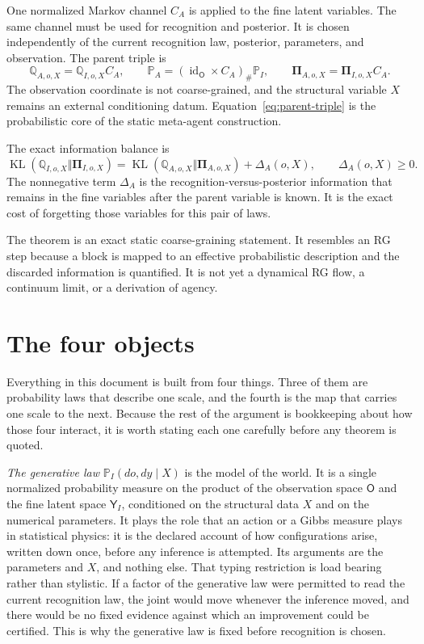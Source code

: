 \documentclass[11pt,letterpaper]{article}
\newcommand{\KL}{\operatorname{KL}}
\newcommand{\Prob}{\mathbb P}
\newcommand{\Rec}{\mathbb Q}
\newcommand{\Post}{\boldsymbol\Pi}
\newcommand{\id}{\operatorname{id}}
\begin{document}
One normalized Markov channel \(C_A\) is applied to the fine latent variables. The same channel must be used for recognition and posterior. It is chosen independently of the current recognition law, posterior, parameters, and observation. The parent triple is
\begin{equation}
  \Rec_{A,o,X}=\Rec_{I,o,X}C_A,
  \qquad
  \Prob_A=(\id_{\mathsf O}\times C_A)_{\#}\Prob_I,
  \qquad
  \Post_{A,o,X}=\Post_{I,o,X}C_A.
  \label{eq:parent-triple}
\end{equation}
The observation coordinate is not coarse-grained, and the structural variable \(X\) remains an external conditioning datum. Equation~\eqref{eq:parent-triple} is the probabilistic core of the static meta-agent construction.

The exact information balance is
\begin{equation}
  \KL(\Rec_{I,o,X}\Vert\Post_{I,o,X})
  =
  \KL(\Rec_{A,o,X}\Vert\Post_{A,o,X})
  +\Delta_A(o,X),
  \qquad
  \Delta_A(o,X)\geq 0.
  \label{eq:kl-chain-preview}
\end{equation}
The nonnegative term \(\Delta_A\) is the recognition-versus-posterior information that remains in the fine variables after the parent variable is known. It is the exact cost of forgetting those variables for this pair of laws.

\begin{physicalreading}
The theorem is an exact static coarse-graining statement. It resembles an RG step because a block is mapped to an effective probabilistic description and the discarded information is quantified. It is not yet a dynamical RG flow, a continuum limit, or a derivation of agency.
\end{physicalreading}

\section{The four objects}
\label{sec:four-objects}

Everything in this document is built from four things. Three of them are probability laws that describe one scale, and the fourth is the map that carries one scale to the next. Because the rest of the argument is bookkeeping about how those four interact, it is worth stating each one carefully before any theorem is quoted.

\textit{The generative law} \(\Prob_I(do,dy\mid X)\) is the model of the world. It is a single normalized probability measure on the product of the observation space \(\mathsf O\) and the fine latent space \(\mathsf Y_I\), conditioned on the structural data \(X\) and on the numerical parameters. It plays the role that an action or a Gibbs measure plays in statistical physics: it is the declared account of how configurations arise, written down once, before any inference is attempted. Its arguments are the parameters and \(X\), and nothing else. That typing restriction is load bearing rather than stylistic. If a factor of the generative law were permitted to read the current recognition law, the joint would move whenever the inference moved, and there would be no fixed evidence against which an improvement could be certified. This is why the generative law is fixed before recognition is chosen.
\end{document}
